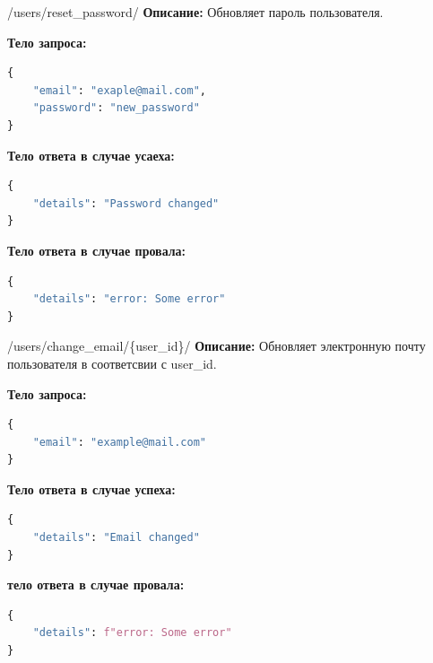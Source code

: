 \documentclass[a4paper,14pt]{extarticle}
\begin{document}
	\begin{putapi}{/users/reset\_password/}
		\textbf{Описание:} Обновляет пароль пользователя.\medskip
		
		\textbf{Тело запроса:}
		\begin{lstlisting}[language=Python]
{
    "email": "exaple@mail.com",
    "password": "new_password"
}
		\end{lstlisting}
		
		\textbf{Тело ответа в случае усаеха:}
		\begin{lstlisting}[language=Python]
{
    "details": "Password changed"
}
		\end{lstlisting}
		
		\textbf{Тело ответа в случае провала:}
		\begin{lstlisting}[language=Python]
{
    "details": "error: Some error"
}
		\end{lstlisting}
	\end{putapi}
	
	\begin{putapi}{/users/change\_email/\{user\_id\}/}
		\textbf{Описание:} Обновляет электронную почту пользователя в соответсвии с user\_id.\medskip
		
		\textbf{Тело запроса:}
		\begin{lstlisting}[language=Python]
{
    "email": "example@mail.com"
}
		\end{lstlisting}
		
		\textbf{Тело ответа в случае успеха:}
		\begin{lstlisting}[language=Python]
{
    "details": "Email changed"
}
		\end{lstlisting}
		
		\textbf{тело ответа в случае провала:}
		\begin{lstlisting}[language=Python]
{
    "details": f"error: Some error"
}
		\end{lstlisting}
	\end{putapi}
\end{document}
